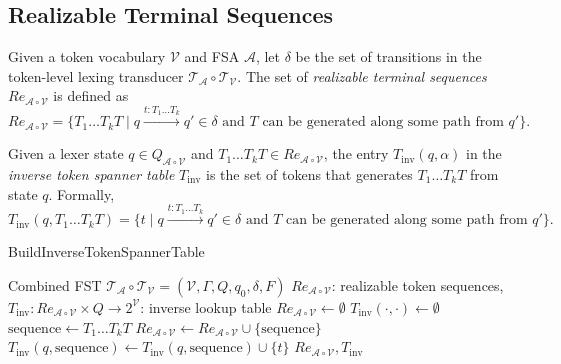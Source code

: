 \subsection{Realizable Terminal Sequences}
\begin{definition}
    \label{def:RealizableTerminalSequence}
    Given a token vocabulary $\mathcal{V}$ and FSA $\mathcal{A}$, let $\delta$ be the set of transitions in the token-level lexing transducer $\mathcal{T}_{\mathcal{A}} \circ \mathcal{T}_{\mathcal{V}}$. The set of \textit{realizable terminal sequences} $Re_{\mathcal{A} \circ \mathcal{V}}$ is defined as
    \[
    Re_{\mathcal{A} \circ \mathcal{V}} = \{ T_1 \ldots T_k T \mid q \xrightarrow{t:T_1 \ldots T_k} q' \in \delta \text{ and } T \text{ can be generated along some path from } q' \}.
    \]
\end{definition}

\begin{definition}
    \label{def:InverseTokenSpannerTable}
    Given a lexer state $q \in Q_{\mathcal{A} \circ \mathcal{V}}$ and $T_1 \ldots T_k T \in Re_{\mathcal{A} \circ \mathcal{V}}$, the entry $T_{\text{inv}}(q, \alpha)$ in the \textit{inverse token spanner table} $T_{\text{inv}}$ is the set of tokens that generates $T_1 \ldots T_k T$ from state $q$. Formally,
    \[
    T_{\text{inv}}(q, T_1 \ldots T_k T) = \{ t \mid q \xrightarrow{t:T_1 \ldots T_k} q' \in \delta \text{ and } T \text{ can be generated along some path from } q' \}.
    \]
\end{definition}

\begin{algorithm}[H]
    \label{alg:BuildInverseTokenSpannerTable}
    \caption{BuildInverseTokenSpannerTable}
    \begin{algorithmic}[1]
        \Require Combined FST \( \mathcal{T}_\mathcal{A} \circ \mathcal{T}_\mathcal{V} = (\mathcal{V}, \Gamma, Q, q_0, \delta, F) \)
        \Ensure \( Re_{\mathcal{A} \circ \mathcal{V}} \): realizable token sequences, \\
        \hspace{2.8em} \( T_{\text{inv}} : Re_{\mathcal{A} \circ \mathcal{V}} \times Q \to 2^{\mathcal{V}} \): inverse lookup table
        \State \( Re_{\mathcal{A} \circ \mathcal{V}} \gets \emptyset \)
        \State \( T_{\text{inv}}(\cdot, \cdot) \gets \emptyset \)
        \State \( \text{sequence} \gets T_1 \ldots T_k T \)
        \State \( Re_{\mathcal{A} \circ \mathcal{V}} \gets Re_{\mathcal{A} \circ \mathcal{V}} \cup \{ \text{sequence} \} \)
        \State \( T_{\text{inv}}(q, \text{sequence}) \gets T_{\text{inv}}(q, \text{sequence}) \cup \{ t \} \)
        \EndFor
        \EndFor
        \State \Return \( Re_{\mathcal{A} \circ \mathcal{V}}, T_{\text{inv}} \)
    \end{algorithmic}
\end{algorithm}

